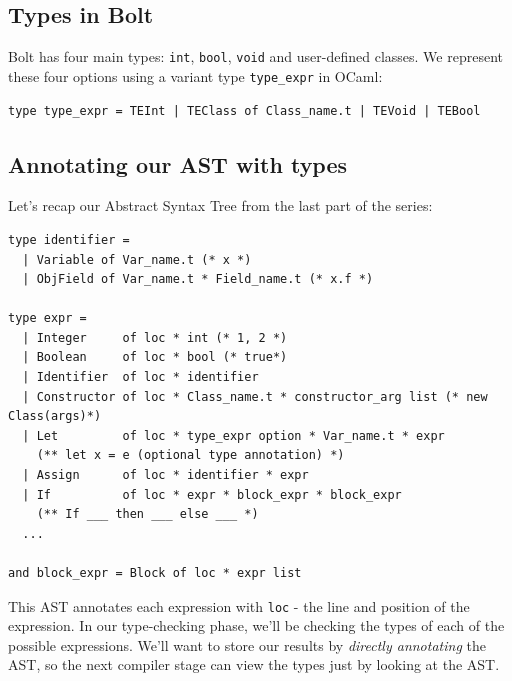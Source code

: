 {{{\subsection{\texorpdfstring{\protect\hyperlink{types-in-bolt}{}Types
in Bolt}{Types in Bolt}}\label{types-in-bolt}}

Bolt has four main types: \texttt{int}, \texttt{bool}, \texttt{void} and
user-defined classes. We represent these four options using a variant
type \texttt{type\_expr} in OCaml:

%

\begin{lstlisting}[language=caml,caption={ast\_types.mli}]
type type_expr = TEInt | TEClass of Class_name.t | TEVoid | TEBool
\end{lstlisting}

\hypertarget{annotating-our-ast-with-types}{%
\subsection{\texorpdfstring{\protect\hyperlink{annotating-our-ast-with-types}{}Annotating
our AST with
types}{Annotating our AST with types}}\label{annotating-our-ast-with-types}}

Let's recap our Abstract Syntax Tree from the last part of the series:

%

\begin{lstlisting}[caption={parsed\_ast.mli},language=caml]
type identifier =
  | Variable of Var_name.t (* x *)
  | ObjField of Var_name.t * Field_name.t (* x.f *)

type expr =
  | Integer     of loc * int (* 1, 2 *)
  | Boolean     of loc * bool (* true*)
  | Identifier  of loc * identifier
  | Constructor of loc * Class_name.t * constructor_arg list (* new Class(args)*)
  | Let         of loc * type_expr option * Var_name.t * expr
    (** let x = e (optional type annotation) *)
  | Assign      of loc * identifier * expr
  | If          of loc * expr * block_expr * block_expr
    (** If ___ then ___ else ___ *)
  ...

and block_expr = Block of loc * expr list
\end{lstlisting}

This AST annotates each expression with \texttt{loc} - the line and
position of the expression. In our type-checking phase, we'll be
checking the types of each of the possible expressions. We'll want to
store our results by \emph{directly annotating} the AST, so the next
compiler stage can view the types just by looking at the AST.

}}
